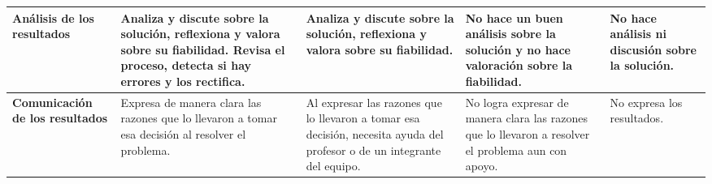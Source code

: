 \documentclass[letterpaper,9pt]{article}
\begin{document}
\begin{table}[h!]
\begin{tabular}{||m{2.5cm}||m{3.5cm}|m{3.5cm}|m{3.5cm}|m{3.5cm}||}
         \hline
         \textbf{Análisis de los resultados} & Analiza y discute sobre la solución, reflexiona y valora sobre su fiabilidad. Revisa el proceso, detecta si hay errores y los rectifica. & Analiza y discute sobre la solución, reflexiona y valora sobre su fiabilidad. & No hace un buen análisis sobre la solución y no hace valoración sobre la fiabilidad. & No hace análisis ni discusión sobre la solución. \\
         \hline
         \textbf{Comunicación de los resultados} & Expresa de manera clara las razones que lo llevaron a tomar esa decisión al resolver el problema. & Al expresar las razones que lo llevaron a tomar esa decisión, necesita ayuda del profesor o de un integrante del equipo. & No logra expresar de manera clara las razones que lo llevaron a resolver el problema aun con apoyo. & No expresa los resultados. \\
         \hline
         \hline
    \end{tabular}
\end{table}
\end{document}
